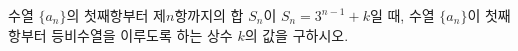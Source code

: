 수열 $\{a_n\}$의 첫째항부터 제$n$항까지의 합 $S_n$이 $S_n=3^{n-1}+k$일 때, 수열 $\{a_n\}$이 첫째항부터 등비수열을 이루도록 하는 상수 $k$의 값을 구하시오.
